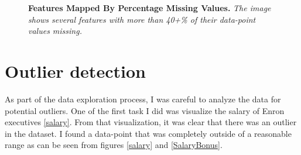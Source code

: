 \documentclass[titlepage,numbers=noenddot,headinclude,%
               footinclude=true,abstractoff,BCOR=5mm,%
               paper=a4,fontsize=11pt,ngerman,american]{scrreprt}
\numberwithin{theorem}{chapter}
\numberwithin{definition}{chapter}
\numberwithin{algorithm}{chapter}
\numberwithin{figure}{chapter}
\numberwithin{table}{chapter}
\numberwithin{equation}{chapter}
\begin{document}
\begin{figure}[!hbtp]
\centering

    \caption{\textbf{Features Mapped By Percentage Missing Values. }\textit{The image shows several features with more than 40+\% of their data-point values missing.}}
\end{figure}



\clearpage

\section*{Outlier detection}
 As part of the data exploration process, I was careful to analyze the data for potential outliers. One of the first task I did was visualize the salary of Enron executives \ref{salary}. From that visualization, it was clear that there was an outlier in the dataset. I found a data-point that was completely outside of a reasonable range as can be seen from figures \ref{salary} and \ref{SalaryBonus}.
\end{document}
